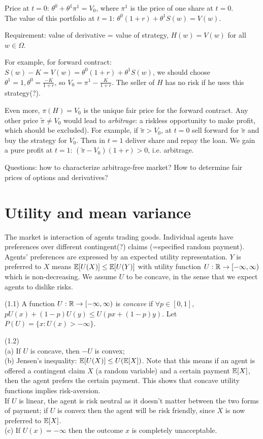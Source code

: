 \documentclass[a4paper]{article}
\begin{document}
Price at $t=0$: $\theta^0+\theta^1 \pi^1 = V_0$, where $\pi^1$ is the price of one share at $t=0$.\\
The value of this portfolio at $t=1$: $\theta^0(1+r) + \theta^1 S(w) = V(w)$.

Requirement: value of derivative = value of strategy, $H(w) = V(w)$ for all $w \in \Omega$.

For example, for forward contract: $S(w)-K = V(w) = \theta^0(1+r)+\theta^1 S(w)$, we should choose $\theta^1 = 1,\theta^0=\frac{-K}{1+r}$, so $V_0 = \pi^1 - \frac{K}{1+r}$. The seller of $H$ has no risk if he uses this strategy(?).

Even more, $\pi(H)=V_0$ is the unique fair price for the forward contract. Any other price $\tilde{\pi} \neq V_0$ would lead to \emph{arbitrage}: a riskless opportunity to make profit, which should be excluded). For example, if $\tilde{\pi} > V_0$, at $t=0$ sell forward for $\tilde{\pi}$ and buy the strategy for $V_0$. Then in $t=1$ deliver share and repay the loan. We gain a pure profit at $t=1$: $(\tilde{\pi}-V_0) (1+r)>0$, i.e. arbitrage.

Questions: how to characterize arbitrage-free market? How to determine fair prices of options and derivatives?

\newpage

\section{Utility and mean variance}

The market is interaction of agents trading goods. Individual agents have preferences over different contingent(?) claims (=specified random payment). Agents' preferences are expressed by an expected utility representation. $Y$ is preferred to $X$ means $\mathbb{E}[U(X)] \leq \mathbb{E}[U(Y)]$ with utility function $U: \mathbb{R} \to [-\infty,\infty)$ which is non-decreasing. We assume $U$ to be concave, in the sense that we expect agents to dislike risks.

\begin{defi} 
(1.1) A function $U:\mathbb{R} \to [-\infty,\infty)$ is \emph{concave} if $\forall p \in [0,1]$, $pU(x) + (1-p) U(y) \leq U(px+(1-p)y)$. Let $P(U) = \{x: U(x)>-\infty\}$.
\end{defi}

\begin{rem} (1.2)\\
(a) If $U$ is concave, then $-U$ is convex;\\
(b) Jensen's inequality: $\mathbb{E}[U(X)] \leq U(\mathbb{E}[X])$. Note that this means if an agent is offered a contingent claim $X$ (a random variable) and a certain payment $\mathbb{E}[X]$, then the agent prefers the certain payment. This shows that concave utility functions implies risk-aversion.\\
If $U$ is linear, the agent is risk neutral as it doesn't matter between the two forms of payment; if $U$ is convex then the agent will be risk friendly, since $X$ is now preferred to $\mathbb{E}[X]$.\\
(c) If $U(x) = -\infty$ then the outcome $x$ is completely unacceptable.
\end{rem}
\end{document}
